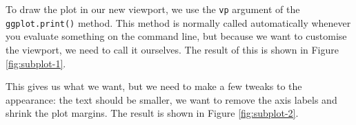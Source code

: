 To draw the plot in our new viewport, we use the \texttt{vp} argument of
the \texttt{ggplot.print()} method. This method is normally called
automatically whenever you evaluate something on the command line, but
because we want to customise the viewport, we need to call it ourselves.
The result of this is shown in Figure \ref{fig:subplot-1}.

\begin{Shaded}
\begin{Highlighting}[]
\NormalTok{(}\NormalTok{, } \NormalTok{, } \NormalTok{)}
\StringTok{ }\NormalTok{(} \NormalTok{, } \NormalTok{, } \NormalTok{, } \NormalTok{)}
 
\NormalTok{()}
\end{Highlighting}
\end{Shaded}

This gives us what we want, but we need to make a few tweaks to the
appearance: the text should be smaller, we want to remove the axis
labels and shrink the plot margins. The result is shown in Figure
\ref{fig:subplot-2}.

\begin{Shaded}
\begin{Highlighting}[]
\StringTok{ }\StringTok{ }
\StringTok{  }\NormalTok{(}\NormalTok{) +}\StringTok{ }
\StringTok{  }\NormalTok{(} \NormalTok{, } \NormalTok{) +}\StringTok{ }
\StringTok{  }\NormalTok{(} \NormalTok{(}\NormalTok{(}\NormalTok{, }\NormalTok{), }\NormalTok{))}

\NormalTok{(}\NormalTok{, } \NormalTok{, } \NormalTok{)}
 
\NormalTok{()}
\end{Highlighting}
\end{Shaded}

